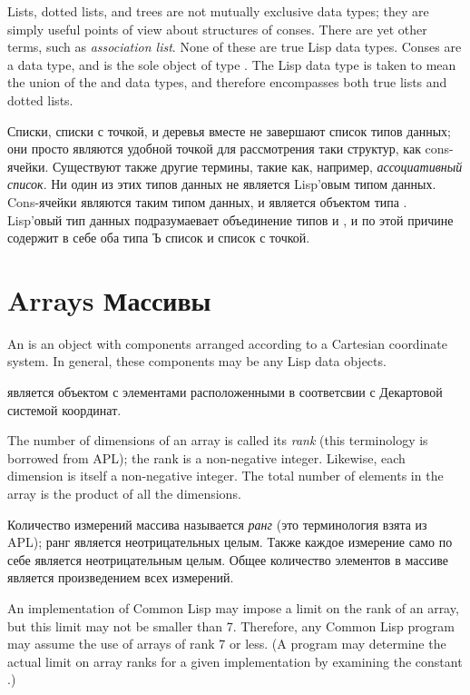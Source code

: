 Lists, dotted lists, and trees are not mutually exclusive data types;
they are simply useful points of view about structures of conses.
There are yet other terms, such as \emph{association list}.
None of these are true Lisp data types.  Conses are a data type,
and {\nil} is the sole object of type .
The Lisp data type  is taken to mean the union of the
 and  data types, and therefore encompasses both
true lists and dotted lists.

Списки, списки с точкой, и деревья вместе не завершают список типов данных;
они просто являются удобной точкой для рассмотрения таки структур, как
cons-ячейки.
Существуют также другие термины, такие как, например, \emph{ассоциативный
  список}. Ни один из этих типов данных не является Lisp'овым типом
данных. Cons-ячейки являются таким типом данных, и {\nil} является объектом типа
. Lisp'овый тип данных  подразумаевает объединение типов
 и , и по этой причине содержит в себе оба типа Ъ
список и список с точкой.

\section{Arrays Массивы}
\label{ARRAY-TYPE-SECTION}

An  is an object with components arranged according
to a Cartesian coordinate system.
In general, these components may be any Lisp data objects.

 является объектом с элементами расположенными в соответсвии с
Декартовой системой координат.

The number of dimensions of an array is called its \emph{rank}
(this terminology is borrowed from APL);
the rank is a non-negative integer.
Likewise, each dimension is itself a non-negative integer.
The total number of elements in the array is the product of all the
dimensions.

Количество измерений массива называется \emph{ранг} (это терминология взята из
APL); ранг является неотрицательных целым.
Также каждое измерение само по себе является неотрицательным целым.
Общее количество элементов в массиве является произведением всех измерений.

An implementation of Common Lisp may impose a limit on the rank of an array,
but this limit may not be smaller than 7.  Therefore, any Common Lisp
program may assume the use of arrays of rank 7 or less.
(A program may determine the actual limit on array ranks for
a given implementation by examining the constant .)

